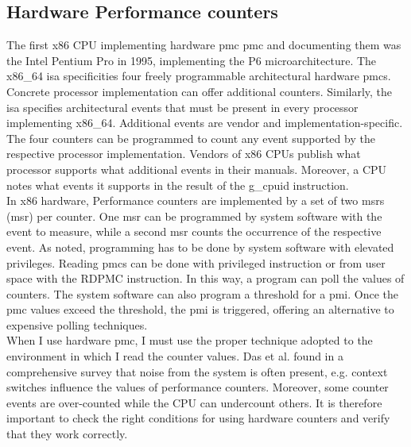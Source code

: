 \subsection{Hardware Performance counters}
\label{sec:state:technical:hpc}
The first x86 CPU implementing hardware \gls{pmc} \gls{pmc} and
documenting them was the Intel Pentium Pro in 1995, implementing the P6
microarchitecture.\cite{intel_sdm} The x86\_64 \gls{isa} specificities
four freely programmable architectural hardware
\gls{pmc}s.\cite{amd_manual} Concrete processor implementation can offer
additional counters. Similarly, the \gls{isa} specifies architectural
events that must be present in every processor implementing x86\_64. Additional
events are vendor and implementation-specific. The four counters can be
programmed to count any event supported by the respective processor
implementation. Vendors of x86 CPUs publish what processor supports what
additional events in their manuals. Moreover, a CPU notes what events it
supports in the result of the \gls{g_cpuid} instruction. \\

In x86 hardware, Performance counters are implemented by a set of two \gls{msr}s
(\gls{msr}) per counter. One \gls{msr} can be programmed by system
software with the event to measure, while a second \gls{msr} counts the
occurrence of the respective event. As noted, programming has to be done by
system software with elevated privileges. Reading \gls{pmc}s can be done
with privileged instruction or from user space with the RDPMC instruction. In
this way, a program can poll the values of counters. The system software can
also program a threshold for a \gls{pmi}. Once the
\gls{pmc} values exceed the threshold, the \gls{pmi} is triggered,
offering an alternative to expensive polling techniques.\\

When I use hardware \gls{pmc}, I must use the proper technique adopted to
the environment in which I read the counter values. Das et al. found in a
comprehensive survey that noise from the system is often present, e.g. context
switches influence the values of performance counters. \cite{das_sok_2019}
Moreover, some counter events are over-counted while the CPU can undercount
others.\cite{weaver_non-determinism_2013} It is therefore important to check the
right conditions for using hardware counters and verify that they work
correctly.

